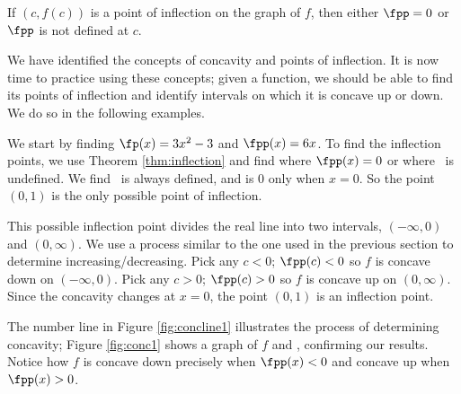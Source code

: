 {If $(c,f(c))$ is a point of inflection on the graph of $f$, then either $\fpp=0$ or $\fpp$ is not defined at $c$.}

We have identified the concepts of concavity and points of inflection. It is now time to practice using these concepts; given a function, we should be able to find its points of inflection and identify intervals on which it is concave up or down. We do so in the following examples.\\



{We start by finding $\fp(x)=3x^2-3$ and $\fpp(x)=6x$.  To find the inflection points, we use Theorem \ref{thm:inflection} and find where $\fpp(x)=0$ or where \fpp\ is undefined. We find \fpp\ is always defined, and is 0 only when $x=0$. So the point $(0,1)$ is the only possible point of inflection.

This possible inflection point divides the real line into two intervals, $(-\infty,0)$ and $(0,\infty)$. We use a process similar to the one used in the previous section to determine increasing/decreasing. Pick any $c<0$; $\fpp(c)<0$ so $f$ is concave down on $(-\infty,0)$. Pick any $c>0$; $\fpp(c)>0$ so $f$ is concave up on $(0,\infty)$. Since the concavity changes at $x=0$, the point $(0,1)$ is an inflection point.

The number line in Figure \ref{fig:concline1} illustrates the process of determining concavity; Figure \ref{fig:conc1} shows a graph of $f$ and \fpp, confirming our results. Notice how $f$ is concave down precisely when $\fpp(x)<0$ and concave up when $\fpp(x)>0$.
}\\



